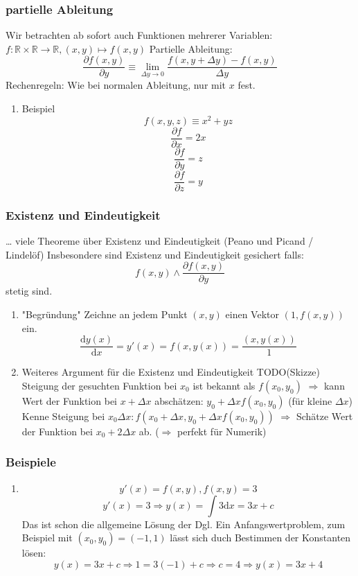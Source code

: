\documentclass[11pt]{article}
\renewcommand{\d}{\mathrm{d}}
\newcommand{\f}[2]{\frac{#1}{#2}}
\begin{document}
\subsubsection{partielle Ableitung}
\label{sec-2-3-3}
Wir betrachten ab sofort auch Funktionen mehrerer Variablen: $f:\mathbb{R}\times\mathbb{R}\to\mathbb{R},(x,y)\mapsto f(x,y)$
Partielle Ableitung: \[\f{\partial f(x,y)}{\partial y} \equiv \lim_{\Delta y \to 0} \f{f(x,y + \Delta y) - f(x,y)}{\Delta y}\]
Rechenregeln: Wie bei normalen Ableitung, nur mit $x$ fest.
\begin{enumerate}
\item Beispiel
\label{sec-2-3-3-1}
\[f(x,y,z) \equiv x^2 + y z\]
\[\f{\partial f}{\partial x} = 2x\]
\[\f{\partial f}{\partial y} = z\]
\[\f{\partial f}{\partial z} = y\]
\end{enumerate}
\subsubsection{Existenz und Eindeutigkeit}
\label{sec-2-3-4}
\ldots{} viele Theoreme über Existenz und Eindeutigkeit (Peano und Picand / Lindelöf)
Insbesondere sind Existenz und Eindeutigkeit gesichert falls:
\[f(x,y) \wedge \f{\partial f(x,y)}{\partial y}\]
stetig sind.
\begin{enumerate}
\item "Begründung"
\label{sec-2-3-4-1}
Zeichne an jedem Punkt $(x,y)$ einen Vektor $(1,f(x,y))$ ein.
\[\f{\d y(x)}{\d x} = y'(x) = f(x,y(x)) = \f{(x,y(x))}{1}\]
\item Weiteres Argument für die Existenz und Eindeutigkeit TODO(Skizze)
\label{sec-2-3-4-2}
Steigung der gesuchten Funktion bei $x_0$ ist bekannt als $f(x_0, y_0)$
$\Rightarrow$ kann Wert der Funktion bei $x + \Delta x$ abschätzen: $y_0 + \Delta x f(x_0,y_0)$ (für kleine $\Delta x$)
Kenne Steigung bei $x_0 \Delta x: f(x_0 + \Delta x, y_0 + \Delta x f(x_0,y_0))$
$\Rightarrow$ Schätze Wert der Funktion bei $x_0 + 2\Delta x$ ab. ($\Rightarrow$ perfekt für Numerik)
\end{enumerate}
\subsubsection{Beispiele}
\label{sec-2-3-5}
\begin{enumerate}
\item \[y'(x) = f(x,y), f(x,y) = 3\]
\[y'(x) = 3 \Rightarrow y(x) = \int 3\d x = 3 x + c\]
Das ist schon die allgemeine Lösung der Dgl.
Ein Anfangswertproblem, zum Beispiel mit $(x_0, y_0) = (-1,1)$ lässt sich duch Bestimmen der Konstanten lösen:
\[y(x) = 3 x + c \Rightarrow 1 = 3(-1) + c \Rightarrow c = 4 \Rightarrow y(x) = 3x + 4\]
\end{enumerate}
\end{document}
